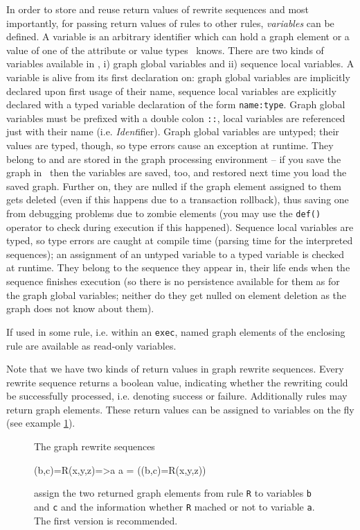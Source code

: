 In order to store and reuse return values of rewrite sequences and most importantly, 
for passing return values of rules to other rules, \emph{variables} can be defined.
A variable is an arbitrary identifier which can hold a graph element or a value of one of the attribute or value types \GrG\ knows.
There are two kinds of variables available in \GrG,
i) graph global variables and 
ii) sequence local variables.
A variable is alive from its first declaration on: graph global variables are implicitly declared upon first usage of their name,
sequence local variables are explicitly declared with a typed variable declaration of the form \texttt{name:type}.
Graph global variables must be prefixed with a double colon \texttt{::}, local variables are referenced just with their name (i.e. \emph{Ident}ifier).
Graph global variables are untyped; their values are typed, though, so type errors cause an exception at runtime.
They belong to and are stored in the graph processing environment -- if you save the graph in \GrShell\ 
then the variables are saved, too, and restored next time you load the saved graph.
Further on, they are nulled if the graph element assigned to them gets deleted (even if this happens due to a transaction rollback),
thus saving one from debugging problems due to zombie elements (you may use the \texttt{def()} operator to check during execution if this happened).
Sequence local variables are typed, so type errors are caught at compile time (parsing time for the interpreted sequences); 
an assignment of an untyped variable to a typed variable is checked at runtime.
They belong to the sequence they appear in, their life ends when the sequence finishes execution 
(so there is no persistence available for them as for the graph global variables; neither do they get nulled on element deletion as the graph does not know about them). 

If used in some rule, i.e. within an \texttt{exec}, named graph elements of the enclosing rule are available as read-only variables.

Note that we have two kinds of return values in graph rewrite sequences.
Every rewrite sequence returns a boolean value, indicating whether the rewriting could be successfully processed, i.e. denoting success or failure.
Additionally rules may return graph elements.
These return values can be assigned to variables on the fly (see example \ref{ex:grsreturn}).
\begin{figure}[htbp]
\begin{example}
	\label{ex:grsreturn}
The graph rewrite sequences
	\begin{grgen}	 
(b,c)=R(x,y,z)=>a
a = ((b,c)=R(x,y,z))
	\end{grgen}
assign the two returned graph elements from rule \texttt{R} to variables \texttt{b} and \texttt{c} and the information whether \texttt{R} mached or not to variable \texttt{a}. The first version is recommended.
\end{example}
\end{figure}


